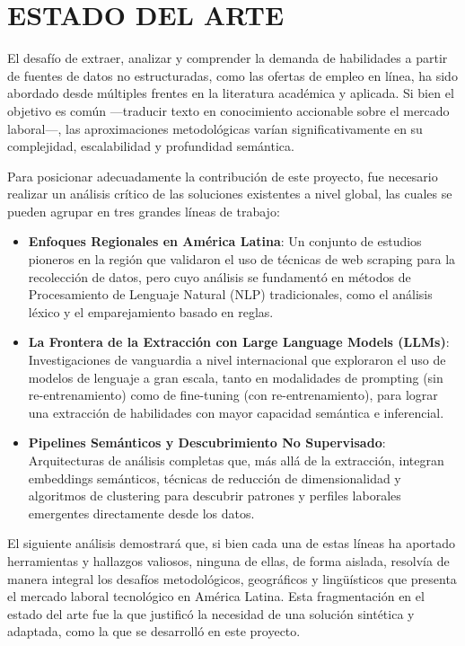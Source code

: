 \chapter{ESTADO DEL ARTE}

El desafío de extraer, analizar y comprender la demanda de habilidades a partir de fuentes de datos no estructuradas, como las ofertas de empleo en línea, ha sido abordado desde múltiples frentes en la literatura académica y aplicada. Si bien el objetivo es común ---traducir texto en conocimiento accionable sobre el mercado laboral---, las aproximaciones metodológicas varían significativamente en su complejidad, escalabilidad y profundidad semántica.

Para posicionar adecuadamente la contribución de este proyecto, fue necesario realizar un análisis crítico de las soluciones existentes a nivel global, las cuales se pueden agrupar en tres grandes líneas de trabajo:

\begin{itemize}
    \item \textbf{Enfoques Regionales en América Latina}: Un conjunto de estudios pioneros en la región que validaron el uso de técnicas de web scraping para la recolección de datos, pero cuyo análisis se fundamentó en métodos de Procesamiento de Lenguaje Natural (NLP) tradicionales, como el análisis léxico y el emparejamiento basado en reglas.

    \item \textbf{La Frontera de la Extracción con Large Language Models (LLMs)}: Investigaciones de vanguardia a nivel internacional que exploraron el uso de modelos de lenguaje a gran escala, tanto en modalidades de prompting (sin re-entrenamiento) como de fine-tuning (con re-entrenamiento), para lograr una extracción de habilidades con mayor capacidad semántica e inferencial.

    \item \textbf{Pipelines Semánticos y Descubrimiento No Supervisado}: Arquitecturas de análisis completas que, más allá de la extracción, integran embeddings semánticos, técnicas de reducción de dimensionalidad y algoritmos de clustering para descubrir patrones y perfiles laborales emergentes directamente desde los datos.
\end{itemize}

El siguiente análisis demostrará que, si bien cada una de estas líneas ha aportado herramientas y hallazgos valiosos, ninguna de ellas, de forma aislada, resolvía de manera integral los desafíos metodológicos, geográficos y lingüísticos que presenta el mercado laboral tecnológico en América Latina. Esta fragmentación en el estado del arte fue la que justificó la necesidad de una solución sintética y adaptada, como la que se desarrolló en este proyecto.

